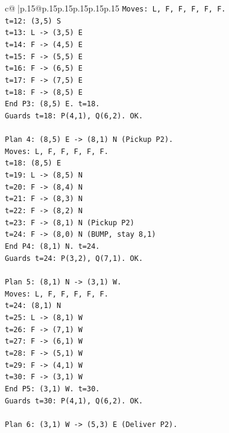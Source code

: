 \documentclass{article}
\begin{document}
{\begin{supertabular}{c@{$\;$}|p{.15\linewidth}@{}p{.15\linewidth}p{.15\linewidth}p{.15\linewidth}p{.15\linewidth}p{.15\linewidth}}
{{{\texttt{Moves: L, F, F, F, F, F.} \\
\texttt{t=12: (3,5) S} \\
\texttt{t=13: L {-}> (3,5) E} \\
\texttt{t=14: F {-}> (4,5) E} \\
\texttt{t=15: F {-}> (5,5) E} \\
\texttt{t=16: F {-}> (6,5) E} \\
\texttt{t=17: F {-}> (7,5) E} \\
\texttt{t=18: F {-}> (8,5) E} \\
\texttt{End P3: (8,5) E. t=18.} \\
\texttt{Guards t=18: P(4,1), Q(6,2). OK.} \\
\\ 
\texttt{Plan 4: (8,5) E {-}> (8,1) N (Pickup P2).} \\
\texttt{Moves: L, F, F, F, F, F.} \\
\texttt{t=18: (8,5) E} \\
\texttt{t=19: L {-}> (8,5) N} \\
\texttt{t=20: F {-}> (8,4) N} \\
\texttt{t=21: F {-}> (8,3) N} \\
\texttt{t=22: F {-}> (8,2) N} \\
\texttt{t=23: F {-}> (8,1) N (Pickup P2)} \\
\texttt{t=24: F {-}> (8,0) N (BUMP, stay 8,1)} \\
\texttt{End P4: (8,1) N. t=24.} \\
\texttt{Guards t=24: P(3,2), Q(7,1). OK.} \\
\\ 
\texttt{Plan 5: (8,1) N {-}> (3,1) W.} \\
\texttt{Moves: L, F, F, F, F, F.} \\
\texttt{t=24: (8,1) N} \\
\texttt{t=25: L {-}> (8,1) W} \\
\texttt{t=26: F {-}> (7,1) W} \\
\texttt{t=27: F {-}> (6,1) W} \\
\texttt{t=28: F {-}> (5,1) W} \\
\texttt{t=29: F {-}> (4,1) W} \\
\texttt{t=30: F {-}> (3,1) W} \\
\texttt{End P5: (3,1) W. t=30.} \\
\texttt{Guards t=30: P(4,1), Q(6,2). OK.} \\
\\ 
\texttt{Plan 6: (3,1) W {-}> (5,3) E (Deliver P2).} \\
}}}
\end{supertabular}}
\end{document}
